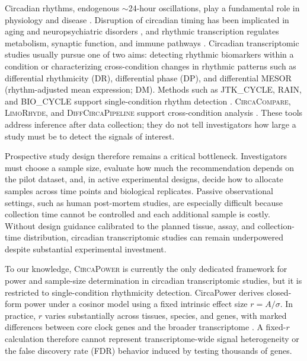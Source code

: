 \documentclass{article}
\begin{document}
Circadian rhythms, endogenous $\sim$24-hour oscillations, play a fundamental role in physiology and disease \citep{takahashi2017transcriptional}. Disruption of circadian timing has been implicated in aging and neuropsychiatric disorders \citep{chen2016aging}, and rhythmic transcription regulates metabolism, synaptic function, and immune pathways \citep{takahashi2017transcriptional,Mure2018baboon,chen2016aging}. Circadian transcriptomic studies usually pursue one of two aims: detecting rhythmic biomarkers within a condition or characterizing cross-condition changes in rhythmic patterns such as differential rhythmicity (DR), differential phase (DP), and differential MESOR (rhythm-adjusted mean expression; DM). Methods such as \textsc{JTK\_CYCLE}, \textsc{RAIN}, and \textsc{BIO\_CYCLE} support single-condition rhythm detection \citep{Hughes2010jtkcycle,Thaben2014rain,Agostinelli2016biocycle}. \textsc{CircaCompare}, \textsc{LimoRhyde}, and \textsc{DiffCircaPipeline} support cross-condition analysis \citep{parsons2020circacompare,Singer2019LimoRhyde,xue2023diffcircapipeline}. These tools address inference after data collection; they do not tell investigators how large a study must be to detect the signals of interest.

Prospective study design therefore remains a critical bottleneck. Investigators must choose a sample size, evaluate how much the recommendation depends on the pilot dataset, and, in active experimental designs, decide how to allocate samples across time points and biological replicates. Passive observational settings, such as human post-mortem studies, are especially difficult because collection time cannot be controlled and each additional sample is costly. Without design guidance calibrated to the planned tissue, assay, and collection-time distribution, circadian transcriptomic studies can remain underpowered despite substantial experimental investment.

To our knowledge, \textsc{CircaPower} \citep{zong2023circapower} is currently the only dedicated framework for power and sample-size determination in circadian transcriptomic studies, but it is restricted to single-condition rhythmicity detection. CircaPower derives closed-form power under a cosinor model using a fixed intrinsic effect size \( r = A/\sigma \). In practice, $r$ varies substantially across tissues, species, and genes, with marked differences between core clock genes and the broader transcriptome \citep{zong2023circapower}. A fixed-$r$ calculation therefore cannot represent transcriptome-wide signal heterogeneity or the false discovery rate (FDR) behavior induced by testing thousands of genes.
\end{document}
